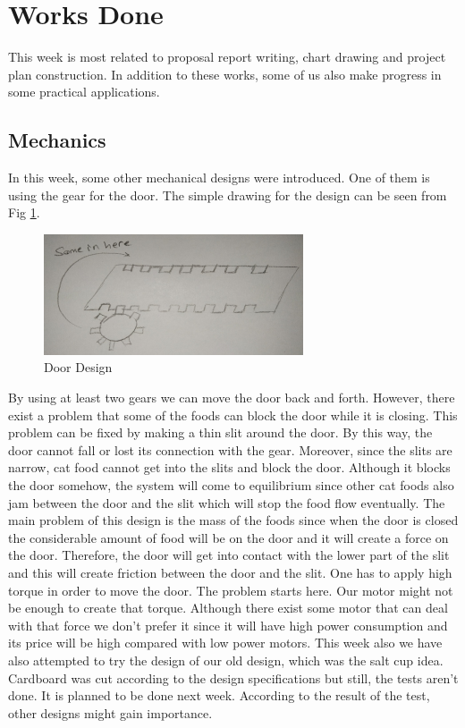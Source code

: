 \section{Works Done}
\label{sec:worksDone}
This week is most related to proposal report writing, chart drawing and project plan construction. In addition to these works, some of us also make progress in some practical applications.
\subsection{Mechanics}
In this week, some other mechanical designs were introduced. One of them is using the gear for the door. The simple drawing for the design can be seen from Fig \ref{fig:mechDoga1}.

\begin{figure}
    \centering
    \includegraphics{img/mechDoga1.png}
    \caption{Door Design}
    \label{fig:mechDoga1}
\end{figure}

By using at least two gears we can move the door back and forth. However, there exist a problem that some of the foods can block the door while it is closing. This problem can be fixed by making a thin slit around the door. By this way, the door cannot fall or lost its connection with the gear. Moreover, since the slits are narrow, cat food cannot get into the slits and block the door. Although it blocks the door somehow, the system will come to equilibrium since other cat foods also jam between the door and the slit which will stop the food flow eventually. 
The main problem of this design is the mass of the foods since when the door is closed the considerable amount of food will be on the door and it will create a force on the door. Therefore, the door will get into contact with the lower part of the slit and this will create friction between the door and the slit. One has to apply high torque in order to move the door. The problem starts here. Our motor might not be enough to create that torque. Although there exist some motor that can deal with that force we don’t prefer it since it will have high power consumption and its price will be high compared with low power motors.
This week also we have also attempted to try the design of our old design, which was the salt cup idea. Cardboard was cut according to the design specifications but still, the tests aren't done. It is planned to be done next week. According to the result of the test, other designs might gain importance.


